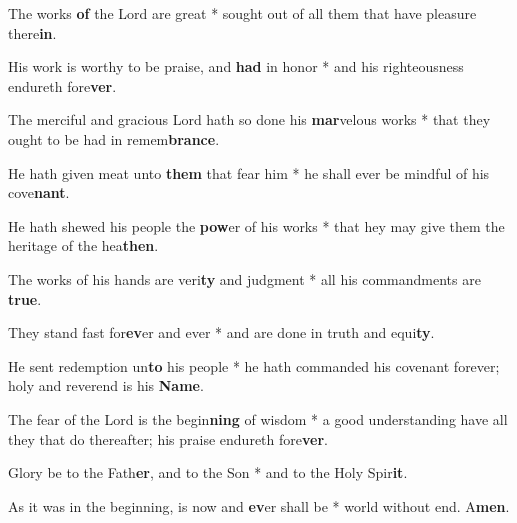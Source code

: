 \begin{multicols}{2}
	The works \textbf{of} the Lord are great * sought out of all them that have pleasure there\textbf{in}.
	
	His work is worthy to be praise, and \textbf{had} in honor * and his righteousness endureth fore\textbf{ver}.
	
	The merciful and gracious Lord hath so done his \textbf{mar}velous works * that they ought to be had in remem\textbf{brance}.
	
	He hath given meat unto \textbf{them} that fear him * he shall ever be mindful of his cove\textbf{nant}.
	
	He hath shewed his people the \textbf{pow}er of his works * that hey may give them the heritage of the hea\textbf{then}.
	
	The works of his hands are veri\textbf{ty} and judgment * all his commandments are \textbf{true}.
	
	They stand fast for\textbf{ev}er and ever * and are done in truth and equi\textbf{ty}.
	
	He sent redemption un\textbf{to} his people * he hath commanded his covenant forever; holy and reverend is his \textbf{Name}.
	
	The fear of the Lord is the begin\textbf{ning} of wisdom * a good understanding have all they that do thereafter; his praise endureth fore\textbf{ver}.
	
	Glory be to the Fath\textbf{er}, and to the Son * and to the Holy Spir\textbf{it}.
	
	As it was in the beginning, is now and \textbf{ev}er shall be * world without end. A\textbf{men}.
\end{multicols}